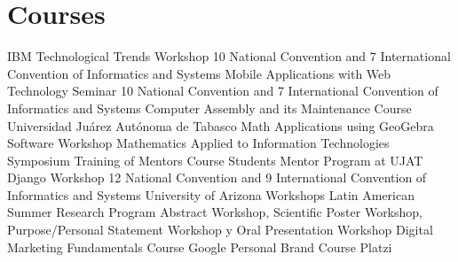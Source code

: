 \documentclass[]{friggeri-cv}
\begin{document}
\section{Courses}
\begin{entrylist}
          {IBM Technological Trends Workshop}
          {10 National Convention and 7 International Convention of Informatics and Systems}
          {}
          {Mobile Applications with Web Technology Seminar}
          {10 National Convention and 7 International Convention of Informatics and Systems}
          {}
          {Computer Assembly and its Maintenance Course}
          {Universidad Ju\'{a}rez Aut\'{o}noma de Tabasco}
          {}
          {Math Applications using GeoGebra Software Workshop}
          {Mathematics Applied to Information Technologies Symposium}
          {}
          {Training of Mentors Course}
          {Students Mentor Program at UJAT}
          {}
          {Django Workshop}
          {12 National Convention and 9 International Convention of Informatics and Systems}
          {}
          {University of Arizona Workshops}
          {Latin American Summer Research Program}
          {Abstract Workshop, Scientific Poster Workshop, Purpose/Personal Statement Workshop y Oral Presentation Workshop}
          {Digital Marketing Fundamentals Course}
          {Google}
          {}
          {Personal Brand Course}
          {Platzi}
          {}
\end{entrylist}
% 
\end{document}
